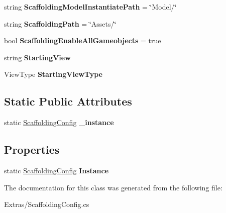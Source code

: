 \begin{DoxyCompactItemize}
\item 
\hypertarget{class_scaffolding_1_1_scaffolding_config_a2ce12de1113d8c1efd370b3d8bdf1b51}{string {\bfseries Scaffolding\+Model\+Instantiate\+Path} = \char`\"{}Model/\char`\"{}}\label{class_scaffolding_1_1_scaffolding_config_a2ce12de1113d8c1efd370b3d8bdf1b51}

\item 
\hypertarget{class_scaffolding_1_1_scaffolding_config_ab77a584978da96b9bed8ee5bcf7884aa}{string {\bfseries Scaffolding\+Path} = \char`\"{}Assets/\char`\"{}}\label{class_scaffolding_1_1_scaffolding_config_ab77a584978da96b9bed8ee5bcf7884aa}

\item 
\hypertarget{class_scaffolding_1_1_scaffolding_config_a2bb653e80aa82c253f3ff1d5c82d9513}{bool {\bfseries Scaffolding\+Enable\+All\+Gameobjects} = true}\label{class_scaffolding_1_1_scaffolding_config_a2bb653e80aa82c253f3ff1d5c82d9513}

\item 
\hypertarget{class_scaffolding_1_1_scaffolding_config_ae94d80ef79bbe1870d5d607571674634}{string {\bfseries Starting\+View}}\label{class_scaffolding_1_1_scaffolding_config_ae94d80ef79bbe1870d5d607571674634}

\item 
\hypertarget{class_scaffolding_1_1_scaffolding_config_aedffba3b54ff1d82e1c4ee39fa3ebec4}{View\+Type {\bfseries Starting\+View\+Type}}\label{class_scaffolding_1_1_scaffolding_config_aedffba3b54ff1d82e1c4ee39fa3ebec4}

\end{DoxyCompactItemize}
\subsection*{Static Public Attributes}
\begin{DoxyCompactItemize}
\item 
\hypertarget{class_scaffolding_1_1_scaffolding_config_a3462d710777d931663953686aa8bb0f6}{static \hyperlink{class_scaffolding_1_1_scaffolding_config}{Scaffolding\+Config} {\bfseries \+\_\+instance}}\label{class_scaffolding_1_1_scaffolding_config_a3462d710777d931663953686aa8bb0f6}

\end{DoxyCompactItemize}
\subsection*{Properties}
\begin{DoxyCompactItemize}
\item 
\hypertarget{class_scaffolding_1_1_scaffolding_config_ae7c97102fe5518cfcdcfd7d440d1f163}{static \hyperlink{class_scaffolding_1_1_scaffolding_config}{Scaffolding\+Config} {\bfseries Instance}}\label{class_scaffolding_1_1_scaffolding_config_ae7c97102fe5518cfcdcfd7d440d1f163}

\end{DoxyCompactItemize}


The documentation for this class was generated from the following file\+:\begin{DoxyCompactItemize}
\item 
Extras/Scaffolding\+Config.\+cs\end{DoxyCompactItemize}
